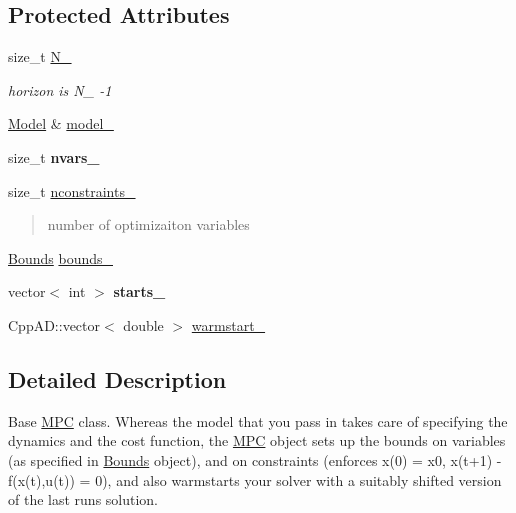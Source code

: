 \subsection*{Protected Attributes}
\begin{DoxyCompactItemize}
\item 
\mbox{\label{classMPC_a2b810b20d87323cce8285d14230c917c}} 
size\+\_\+t \mbox{\hyperlink{classMPC_a2b810b20d87323cce8285d14230c917c}{N\+\_\+}}
\begin{DoxyCompactList}\small\item\em horizon is N\+\_\+ -\/1 \end{DoxyCompactList}\item 
\mbox{\hyperlink{classModel}{Model}} \& \mbox{\hyperlink{classMPC_abbf9a3b26a6cbc6cad87cac1c8f2aaaf}{model\+\_\+}}
\item 
\mbox{\label{classMPC_a9a9db53c26d46e7579d02a5d08c0358c}} 
size\+\_\+t {\bfseries nvars\+\_\+}
\item 
\mbox{\label{classMPC_ac89334cea51103f0a4a20268b7d748ef}} 
size\+\_\+t \mbox{\hyperlink{classMPC_ac89334cea51103f0a4a20268b7d748ef}{nconstraints\+\_\+}}
\begin{DoxyCompactList}\small\item\em \begin{quote}
number of optimizaiton variables\end{quote}
\end{DoxyCompactList}\item 
\mbox{\hyperlink{structBounds}{Bounds}} \mbox{\hyperlink{classMPC_a821e5a57b25e8c83aaae02d44dab3ea8}{bounds\+\_\+}}
\item 
\mbox{\label{classMPC_af52144a70629c4809d28790fd7c0fdf3}} 
vector$<$ int $>$ {\bfseries starts\+\_\+}
\item 
Cpp\+A\+D\+::vector$<$ double $>$ \mbox{\hyperlink{classMPC_a303dcbda2e7d051f5f8a34e01bc414bc}{warmstart\+\_\+}}
\end{DoxyCompactItemize}


\subsection{Detailed Description}
Base \mbox{\hyperlink{classMPC}{M\+PC}} class. Whereas the model that you pass in takes care of specifying the dynamics and the cost function, the \mbox{\hyperlink{classMPC}{M\+PC}} object sets up the bounds on variables (as specified in \mbox{\hyperlink{structBounds}{Bounds}} object), and on constraints (enforces x(0) = x0, x(t+1) -\/ f(x(t),u(t)) = 0), and also warmstarts your solver with a suitably shifted version of the last run\textquotesingle{}s solution. 

